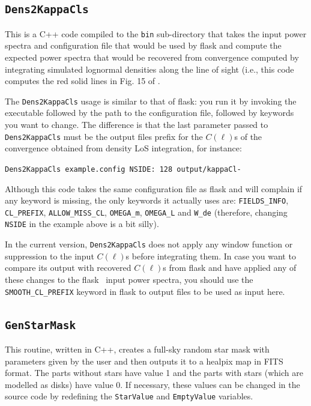 \documentclass[12pt]{book} %
\begin{document}
\subsection{{\tt Dens2KappaCls}}
\label{sec:dens2kappacls}

This is a C++ code compiled to the {\tt bin} sub-directory that takes the input power spectra and 
configuration file that would be used by {\sc flask} and compute the expected power spectra that 
would be recovered from convergence computed by integrating simulated lognormal densities along 
the line of sight (i.e., this code computes the red solid lines in Fig. 15 of \citet{Xavier16mn}. 

The {\tt Dens2KappaCls} usage is similar to that of {\sc flask}: you run it by invoking the 
executable followed by the path to the configuration file, followed by keywords you want to 
change. The difference is that the last parameter passed to {\tt Dens2KappaCls} must be the 
output files prefix for the $C(\ell)$s of the convergence obtained from density LoS integration, 
for instance:

\noindent
{\tt Dens2KappaCls example.config NSIDE: 128 output/kappaCl-}

Although this code takes the same configuration file as {\sc flask} and will complain if any 
keyword is missing, the only keywords it actually uses are: {\tt FIELDS\_INFO}, 
{\tt CL\_PREFIX}, {\tt ALLOW\_MISS\_CL}, {\tt OMEGA\_m}, {\tt OMEGA\_L} and 
{\tt W\_de} (therefore, changing {\tt NSIDE} in the example 
above is a bit silly).

In the current version, {\tt Dens2KappaCls} does not apply any window function or suppression 
to the input $C(\ell)$s before integrating them. In case you want to compare its output with 
recovered $C(\ell)$s from {\sc flask} and have applied any of these changes to the {\sc flask} \
input power spectra, you should use the {\tt SMOOTH\_CL\_PREFIX} keyword in {\sc flask} to 
output files to be used as input here.

\subsection{{\tt GenStarMask}}
\label{sec:genstarmask}

This routine, written in C++, creates a full-sky random star mask with parameters given by the user and 
then outputs it to a {\sc healpix} map in FITS format. The parts without stars have value 1 and 
the parts with stars (which are modelled as disks) have value 0. If necessary, these values 
can be changed in the source code by redefining the {\tt StarValue} and {\tt EmptyValue} 
variables.
\end{document}
